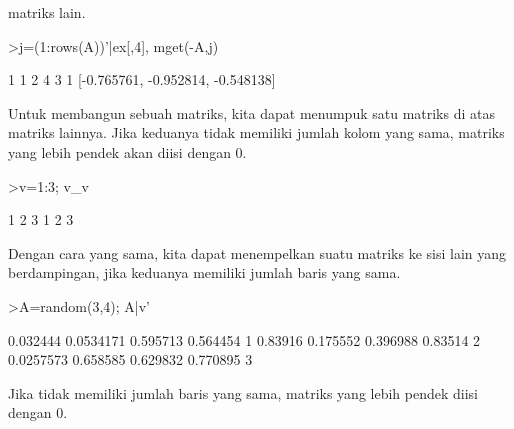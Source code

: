 \documentclass[a4paper,10pt]{article}
\begin{document}
\begin{eulernotebook}
\begin{eulercomment}
\begin{eulercomment}
\begin{eulercomment}
\begin{eulercomment}
\begin{eulercomment}
\begin{eulercomment}
\begin{eulercomment}
matriks lain.
\end{eulercomment}
\begin{eulerprompt}
>j=(1:rows(A))'|ex[,4], mget(-A,j)
\end{eulerprompt}
\begin{euleroutput}
              1             1 
              2             4 
              3             1 
  [-0.765761,  -0.952814,  -0.548138]
\end{euleroutput}
\begin{eulercomment}
Untuk membangun sebuah matriks, kita dapat menumpuk satu matriks di
atas matriks lainnya. Jika keduanya tidak memiliki jumlah kolom yang
sama, matriks yang lebih pendek akan diisi dengan 0.
\end{eulercomment}
\begin{eulerprompt}
>v=1:3; v_v
\end{eulerprompt}
\begin{euleroutput}
              1             2             3 
              1             2             3 
\end{euleroutput}
\begin{eulercomment}
Dengan cara yang sama, kita dapat menempelkan suatu matriks ke sisi
lain yang berdampingan, jika keduanya memiliki jumlah baris yang sama.
\end{eulercomment}
\begin{eulerprompt}
>A=random(3,4); A|v'
\end{eulerprompt}
\begin{euleroutput}
       0.032444     0.0534171      0.595713      0.564454             1 
        0.83916      0.175552      0.396988       0.83514             2 
      0.0257573      0.658585      0.629832      0.770895             3 
\end{euleroutput}
\begin{eulercomment}
Jika tidak memiliki jumlah baris yang sama, matriks yang lebih pendek
diisi dengan 0.


\end{eulercomment}
\end{eulercomment}
\end{eulercomment}
\end{eulercomment}
\end{eulercomment}
\end{eulercomment}
\end{eulercomment}
\end{eulernotebook}
\end{document}
